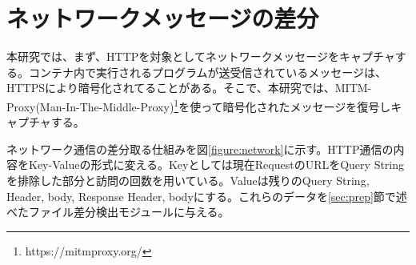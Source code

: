 \documentclass[a4paper,twocolumn,10pt]{jarticle}
\begin{document}
\section{ネットワークメッセージの差分}
\label{sec:net}
本研究では、まず、HTTPを対象としてネットワークメッセージをキャプチャする。コンテナ内で実行されるプログラムが送受信されているメッセージは、HTTPSにより暗号化されてることがある。そこで、本研究では、MITM-Proxy(Man-In-The-Middle-Proxy)\footnote{https://mitmproxy.org/}を使って暗号化されたメッセージを復号しキャプチャする。

ネットワーク通信の差分取る仕組みを図\ref{figure:network}に示す。HTTP通信の内容をKey-Valueの形式に変える。Keyとしては現在RequestのURLをQuery Stringを排除した部分と訪問の回数を用いている。Valueは残りのQuery String, Header, body, Response Header, bodyにする。これらのデータを\ref{sec:prep}節で述べたファイル差分検出モジュールに与える。











 
 
\end{document}
